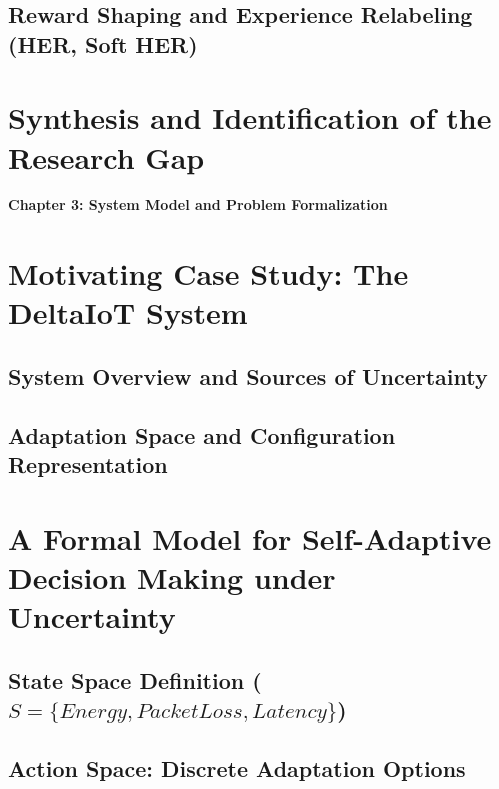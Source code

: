 \documentclass[11pt,a4paper]{article}
\begin{document}
\subsection{Reward Shaping and Experience Relabeling (HER, Soft HER)}

\section{Synthesis and Identification of the Research Gap}

\newpage

\vspace*{1cm}
{\centering \huge \textbf{Chapter 3: System Model and Problem Formalization} \par}
\vspace{1cm}

\setcounter{section}{0}
\renewcommand{\thesection}{3.\arabic{section}}
\renewcommand{\thesubsection}{3.\arabic{section}.\arabic{subsection}}

\section{Motivating Case Study: The DeltaIoT System}
\subsection{System Overview and Sources of Uncertainty}
\subsection{Adaptation Space and Configuration Representation}

\section{A Formal Model for Self-Adaptive Decision Making under Uncertainty}
\subsection{State Space Definition ($S = \{Energy, Packet Loss, Latency\}$)}
\subsection{Action Space: Discrete Adaptation Options}
\end{document}
